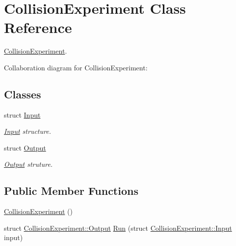 \hypertarget{classCollisionExperiment}{}\section{Collision\+Experiment Class Reference}
\label{classCollisionExperiment}


\hyperlink{classCollisionExperiment}{Collision\+Experiment}.  




Collaboration diagram for Collision\+Experiment\+:
\subsection*{Classes}
\begin{DoxyCompactItemize}
\item 
struct \hyperlink{structCollisionExperiment_1_1Input}{Input}
\begin{DoxyCompactList}\small\item\em \hyperlink{structCollisionExperiment_1_1Input}{Input} structure. \end{DoxyCompactList}\item 
struct \hyperlink{structCollisionExperiment_1_1Output}{Output}
\begin{DoxyCompactList}\small\item\em \hyperlink{structCollisionExperiment_1_1Output}{Output} struture. \end{DoxyCompactList}\end{DoxyCompactItemize}
\subsection*{Public Member Functions}
\begin{DoxyCompactItemize}
\item 
\hyperlink{classCollisionExperiment_a375aae9f2164d88548749be91ce7f2f0}{Collision\+Experiment} ()
\item 
struct \hyperlink{structCollisionExperiment_1_1Output}{Collision\+Experiment\+::\+Output} \hyperlink{classCollisionExperiment_ac198174601167b9d057c99f1f8071dd0}{Run} (struct \hyperlink{structCollisionExperiment_1_1Input}{Collision\+Experiment\+::\+Input} input)
\end{DoxyCompactItemize}
